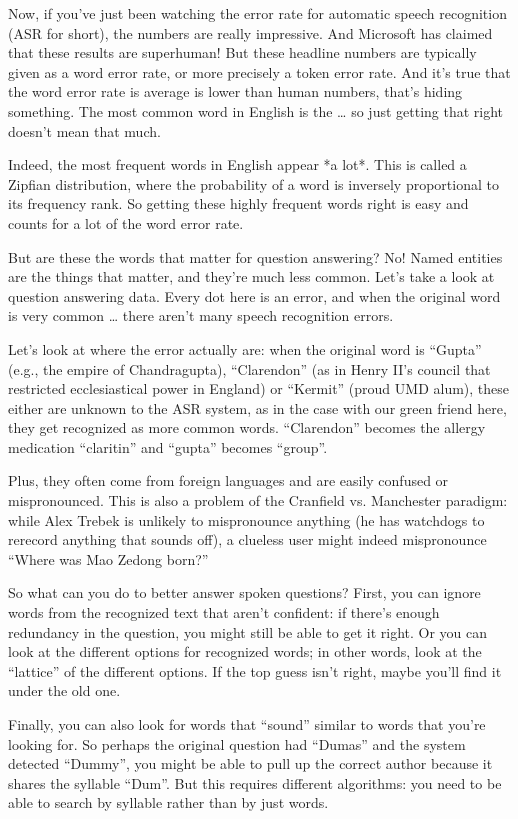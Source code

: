 Now, if you’ve just been watching the error rate for automatic speech recognition (ASR for short), the numbers are really impressive.  And Microsoft has claimed that these results are superhuman!  But these headline numbers are typically given as a word error rate, or more precisely a token error rate.  And it’s true that the word error rate is average is lower than human numbers, that’s hiding something.  The most common word in English is the … so just getting that right doesn’t mean that much.

Indeed, the most frequent words in English appear *a lot*.  This is called a Zipfian distribution, where the probability of a word is inversely proportional to its frequency rank.  So getting these highly frequent words right is easy and counts for a lot of the word error rate.  

But are these the words that matter for question answering?  No!  Named entities are the things that matter, and they’re much less common.  Let’s take a look at question answering data.  Every dot here is an error, and when the original word is very common … there aren’t many speech recognition errors.

Let’s look at where the error actually are: when the original word is “Gupta” (e.g., the empire of Chandragupta), “Clarendon” (as in Henry II’s council that restricted ecclesiastical power in England) or “Kermit” (proud UMD alum), these either are unknown to the ASR system, as in the case with our green friend here, they get recognized as more common words.  “Clarendon” becomes the allergy medication “claritin” and “gupta” becomes “group”.  

Plus, they often come from foreign languages and are easily confused or mispronounced.  This is also a problem of the Cranfield vs. Manchester paradigm: while Alex Trebek is unlikely to mispronounce anything (he has watchdogs to rerecord anything that sounds off), a clueless user might indeed mispronounce “Where was Mao Zedong born?”

So what can you do to better answer spoken questions?  First, you can ignore words from the recognized text that aren’t confident: if there’s enough redundancy in the question, you might still be able to get it right.  Or you can look at the different options for recognized words; in other words, look at the “lattice” of the different options.  If the top guess isn’t right, maybe you’ll find it under the old one.

Finally, you can also look for words that “sound” similar to words that you’re looking for.  So perhaps the original question had “Dumas” and the system detected “Dummy”, you might be able to pull up the correct author because it shares the syllable “Dum”.  But this requires different algorithms: you need to be able to search by syllable rather than by just words.

